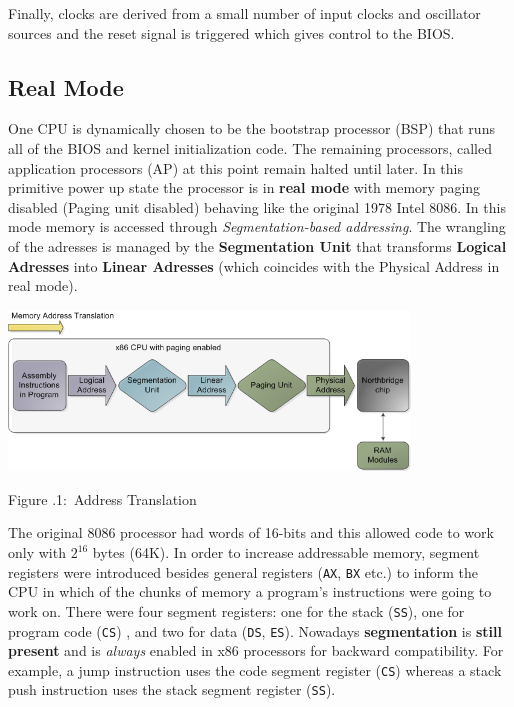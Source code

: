 \documentclass[twoside]{article}
\newcounter{lecnum}
\newcommand{\fig}[3]{
            \vspace{#2}
            \begin{center}
            Figure \thelecnum.#1:~#3
            \end{center}
    }
\begin{document}
Finally, clocks are derived from a small number of input clocks and oscillator sources and the reset signal is triggered which gives control to the BIOS.

\subsection{Real Mode}
One  CPU is dynamically chosen to be the bootstrap processor (BSP) that runs all of the BIOS and kernel initialization code. The remaining processors, called application processors (AP) at this point remain halted until later. In this primitive power up state the processor is in \textbf{real mode} with memory paging disabled (Paging unit disabled) behaving like the original 1978 Intel 8086. In this mode memory is accessed through \textit{Segmentation-based addressing}. The wrangling of the adresses is managed by the \textbf{Segmentation Unit} that transforms \textbf{Logical Adresses} into \textbf{Linear Adresses} (which coincides with the Physical Address in real mode).
\begin{center}
  \includegraphics[width=0.8\textwidth]{memtrans.png}
  \fig{1}{0 pt}{Address Translation}
\end{center}

The  original 8086 processor had words of 16-bits and this allowed code to work only with $2^{16}$ bytes (64K). In order to increase addressable memory, segment registers were introduced besides general registers (\texttt{AX}, \texttt{BX} etc.) to inform the CPU in which of the chunks of memory a program's instructions were going to work on. There were four segment registers: one for the stack (\texttt{SS}), one for program code (\texttt{CS}) , and two for data (\texttt{DS}, \texttt{ES}). Nowadays \textbf{segmentation} is \textbf{still present} and is \textit{always} enabled in x86 processors for backward compatibility. For example, a jump instruction uses the code segment register (\texttt{CS}) whereas a stack push instruction uses the stack segment register (\texttt{SS}).
\end{document}
